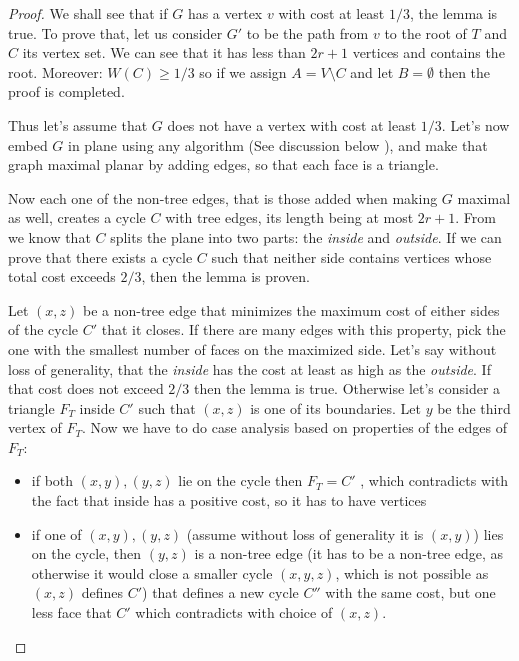 \begin{proof}
    We shall see that if $G$ has a vertex $v$ with cost at least $1/3$, the lemma is
    true. To prove that, let us consider $G'$ to be the path from $v$ to the root of $T$ and
    $C$ its vertex set.
    We can see that it
    has less than $2r + 1$ vertices and contains the root. Moreover: $W(C) \geq 1/3$
    so if we assign $A = V \setminus C$ and let $B
    = \emptyset$ then the proof is completed. 

    Thus let's assume that $G$ does not have a vertex with cost at least $1/3$.
    Let's now embed $G$ in plane using any algorithm (See discussion below
    ),
    and make that graph maximal planar by 
    adding edges, so that each face is a triangle.

    Now each
    one of the non-tree edges, that is those added when making $G$ maximal as well,
    creates a cycle $C$ with tree edges, its length being at most $2r + 1$.
    From 
    we know that $C$ splits the plane into two parts: the \textit{inside} and
    \textit{outside}. If we can prove that there exists a cycle $C$ such that
    neither side contains vertices whose total cost exceeds $2/3$, then the
    lemma is proven.

    Let $(x, z)$ be a non-tree edge that minimizes the maximum cost of either sides of
    the cycle $C'$ that it closes. If there are many edges with this property, pick
    the one with the smallest number of faces on the maximized side. Let's say
    without loss of generality, that the \textit{inside} has the cost at least
    as high as the \textit{outside}. If that cost does not exceed $2/3$ then the
    lemma is true. Otherwise let's consider a triangle $F_T$ inside $C'$ such that
    $(x, z)$ is one of its boundaries. Let $y$ be the third vertex of $F_T$.
    Now we have to do case analysis based on properties of the edges of $F_T$:
    \begin{itemize}
        \item if both $(x, y), (y, z)$ lie on the cycle then $F_T = C'$ , which
        contradicts with the fact that inside has a positive cost, so it has to
        have vertices
    \item if one of $(x, y), (y, z)$ (assume without loss of generality it is
        $(x, y)$) lies on the cycle, then $(y, z)$ is a non-tree edge (it has 
        to be a non-tree edge, as otherwise it would close a smaller cycle $(x, y, z)$,
        which 
        is not possible as $(x, z)$ defines $C'$) that
        defines a new cycle $C''$ with the same cost, but one less face that
        $C'$ which contradicts with choice of $(x, z)$.
        \begin{figure}[H]
            \centering


\end{figure}
\end{itemize}
\end{proof}

